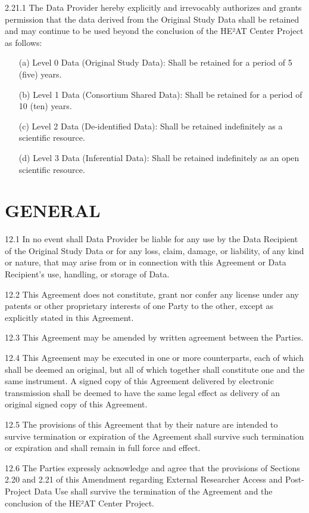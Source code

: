 \documentclass[12pt,letterpaper]{article}
\newcommand{\added}[1]{\textcolor{addcolor}{#1}}
\begin{document}
\added{2.21.1 The Data Provider hereby explicitly and irrevocably authorizes and grants permission that the data derived from the Original Study Data shall be retained and may continue to be used beyond the conclusion of the HE²AT Center Project as follows:
\begin{itemize}
\item[(a)] Level 0 Data (Original Study Data): Shall be retained for a period of 5 (five) years.
\item[(b)] Level 1 Data (Consortium Shared Data): Shall be retained for a period of 10 (ten) years.
\item[(c)] Level 2 Data (De-identified Data): Shall be retained indefinitely as a scientific resource.
\item[(d)] Level 3 Data (Inferential Data): Shall be retained indefinitely as an open scientific resource.
\end{itemize}}

\section{GENERAL}

12.1 In no event shall Data Provider be liable for any use by the Data Recipient of the Original Study Data or for any loss, claim, damage, or liability, of any kind or nature, that may arise from or in connection with this Agreement or Data Recipient's use, handling, or storage of Data.

12.2 This Agreement does not constitute, grant nor confer any license under any patents or other proprietary interests of one Party to the other, except as explicitly stated in this Agreement.

12.3 This Agreement may be amended by written agreement between the Parties.

12.4 This Agreement may be executed in one or more counterparts, each of which shall be deemed an original, but all of which together shall constitute one and the same instrument. A signed copy of this Agreement delivered by electronic transmission shall be deemed to have the same legal effect as delivery of an original signed copy of this Agreement.

12.5 The provisions of this Agreement that by their nature are intended to survive termination or expiration of the Agreement shall survive such termination or expiration and shall remain in full force and effect.

\added{12.6 The Parties expressly acknowledge and agree that the provisions of Sections 2.20 and 2.21 of this Amendment regarding External Researcher Access and Post-Project Data Use shall survive the termination of the Agreement and the conclusion of the HE²AT Center Project.}
\end{document}
